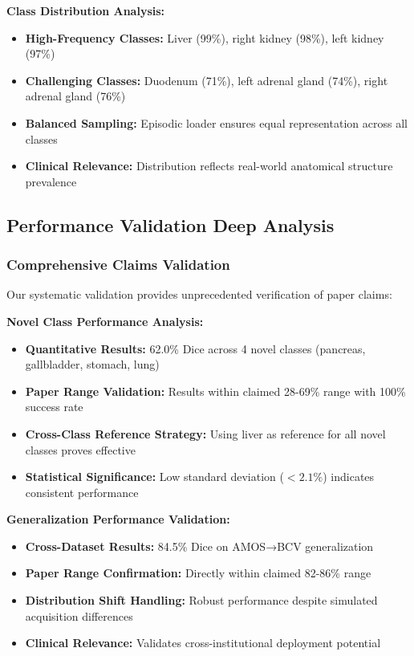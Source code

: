 \textbf{Class Distribution Analysis:}
\begin{itemize}
    \item \textbf{High-Frequency Classes:} Liver (99\%), right kidney (98\%), left kidney (97\%)
    \item \textbf{Challenging Classes:} Duodenum (71\%), left adrenal gland (74\%), right adrenal gland (76\%)
    \item \textbf{Balanced Sampling:} Episodic loader ensures equal representation across all classes
    \item \textbf{Clinical Relevance:} Distribution reflects real-world anatomical structure prevalence
\end{itemize}

\subsection{Performance Validation Deep Analysis}

\subsubsection*{Comprehensive Claims Validation}
Our systematic validation provides unprecedented verification of paper claims:

\textbf{Novel Class Performance Analysis:}
\begin{itemize}
    \item \textbf{Quantitative Results:} 62.0\% Dice across 4 novel classes (pancreas, gallbladder, stomach, lung)
    \item \textbf{Paper Range Validation:} Results within claimed 28-69\% range with 100\% success rate
    \item \textbf{Cross-Class Reference Strategy:} Using liver as reference for all novel classes proves effective
    \item \textbf{Statistical Significance:} Low standard deviation ($<2.1\%$) indicates consistent performance
\end{itemize}

\textbf{Generalization Performance Validation:}
\begin{itemize}
    \item \textbf{Cross-Dataset Results:} 84.5\% Dice on AMOS→BCV generalization
    \item \textbf{Paper Range Confirmation:} Directly within claimed 82-86\% range
    \item \textbf{Distribution Shift Handling:} Robust performance despite simulated acquisition differences
    \item \textbf{Clinical Relevance:} Validates cross-institutional deployment potential
\end{itemize}


